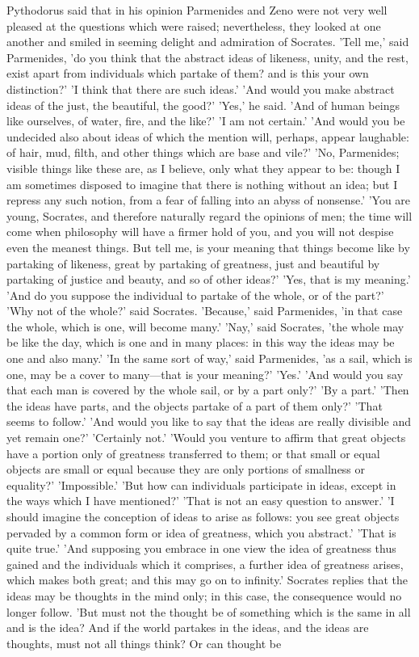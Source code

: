 \documentclass[11pt,letter]{article}
\begin{document}
\par  Pythodorus said that in his opinion Parmenides and Zeno were not very well pleased at the questions which were raised; nevertheless, they looked at one another and smiled in seeming delight and admiration of Socrates. 'Tell me,' said Parmenides, 'do you think that the abstract ideas of likeness, unity, and the rest, exist apart from individuals which partake of them? and is this your own distinction?' 'I think that there are such ideas.' 'And would you make abstract ideas of the just, the beautiful, the good?' 'Yes,' he said. 'And of human beings like ourselves, of water, fire, and the like?' 'I am not certain.' 'And would you be undecided also about ideas of which the mention will, perhaps, appear laughable: of hair, mud, filth, and other things which are base and vile?' 'No, Parmenides; visible things like these are, as I believe, only what they appear to be: though I am sometimes disposed to imagine that there is nothing without an idea; but I repress any such notion, from a fear of falling into an abyss of nonsense.' 'You are young, Socrates, and therefore naturally regard the opinions of men; the time will come when philosophy will have a firmer hold of you, and you will not despise even the meanest things. But tell me, is your meaning that things become like by partaking of likeness, great by partaking of greatness, just and beautiful by partaking of justice and beauty, and so of other ideas?' 'Yes, that is my meaning.' 'And do you suppose the individual to partake of the whole, or of the part?' 'Why not of the whole?' said Socrates. 'Because,' said Parmenides, 'in that case the whole, which is one, will become many.' 'Nay,' said Socrates, 'the whole may be like the day, which is one and in many places: in this way the ideas may be one and also many.' 'In the same sort of way,' said Parmenides, 'as a sail, which is one, may be a cover to many—that is your meaning?' 'Yes.' 'And would you say that each man is covered by the whole sail, or by a part only?' 'By a part.' 'Then the ideas have parts, and the objects partake of a part of them only?' 'That seems to follow.' 'And would you like to say that the ideas are really divisible and yet remain one?' 'Certainly not.' 'Would you venture to affirm that great objects have a portion only of greatness transferred to them; or that small or equal objects are small or equal because they are only portions of smallness or equality?' 'Impossible.' 'But how can individuals participate in ideas, except in the ways which I have mentioned?' 'That is not an easy question to answer.' 'I should imagine the conception of ideas to arise as follows: you see great objects pervaded by a common form or idea of greatness, which you abstract.' 'That is quite true.' 'And supposing you embrace in one view the idea of greatness thus gained and the individuals which it comprises, a further idea of greatness arises, which makes both great; and this may go on to infinity.' Socrates replies that the ideas may be thoughts in the mind only; in this case, the consequence would no longer follow. 'But must not the thought be of something which is the same in all and is the idea? And if the world partakes in the ideas, and the ideas are thoughts, must not all things think? Or can thought be 
\end{document}
